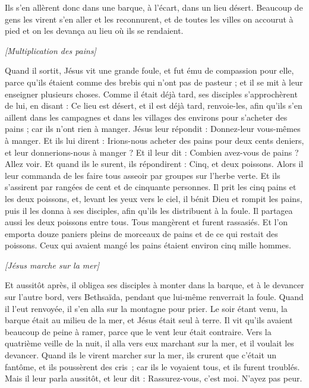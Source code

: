 \begin{multicols}{2}
Ils s'en allèrent donc dans une barque, à l’écart, dans un lieu désert.
Beaucoup de gens les virent s’en aller et les reconnurent, et de toutes les villes on accourut à pied et on les devança au lieu où ils se rendaient.
\begin{center}
\textit{[Multiplication des pains]}
\end{center}
\PPE{}
Quand il sortit, Jésus vit une grande foule, et fut ému de compassion pour elle, parce qu’ils étaient comme des brebis qui n'ont pas de pasteur ; et il se mit à leur enseigner plusieurs choses.
Comme il était déjà tard, ses disciples s'approchèrent de lui, en disant : Ce lieu est désert, et il est déjà tard,
renvoie-les, afin qu’ils s'en aillent dans les campagnes et dans les villages des environs pour s’acheter des pains ; car ils n'ont rien à manger.
Jésus leur répondit : Donnez-leur vous-mêmes à manger. Et ils lui dirent : Irions-nous acheter des pains pour deux cents deniers, et leur donnerions-nous à manger ?
Et il leur dit : Combien avez-vous de pains ? Allez voir. Et quand ils le surent, ils répondirent : Cinq, et deux poissons.
Alors il leur commanda de les faire tous asseoir par groupes sur l'herbe verte.
Et ils s'assirent par rangées de cent et de cinquante personnes.
Il prit les cinq pains et les deux poissons, et, levant les yeux vers le ciel, il bénit Dieu et rompit les pains, puis il les donna à ses disciples, afin qu'ils les distribuent à la foule. Il partagea aussi les deux poissons entre tous.
Tous mangèrent et furent rassasiés.
Et l’on emporta douze paniers pleins de morceaux de pains et de ce qui restait des poissons.
Ceux qui avaient mangé les pains étaient environ cinq mille hommes.
\begin{center}
\textit{[Jésus marche sur la mer]}
\end{center}
\PPE{}
Et aussitôt après, il obligea ses disciples à monter dans la barque, et à le devancer sur l’autre bord, vers Bethsaïda, pendant que lui-même renverrait la foule.
Quand il l’eut renvoyée, il s'en alla sur la montagne pour prier.
Le soir étant venu, la barque était au milieu de la mer, et Jésus était seul à terre.
Il vit qu'ils avaient beaucoup de peine à ramer, parce que le vent leur était contraire. Vers la quatrième veille de la nuit, il alla vers eux marchant sur la mer, et il voulait les devancer.
Quand ils le virent marcher sur la mer, ils crurent que c’était un fantôme, et ils poussèrent des cris ;
car ils le voyaient tous, et ils furent troublés. Mais il leur parla aussitôt, et leur dit : Rassurez-vous, c'est moi. N’ayez pas peur.

\end{multicols}
